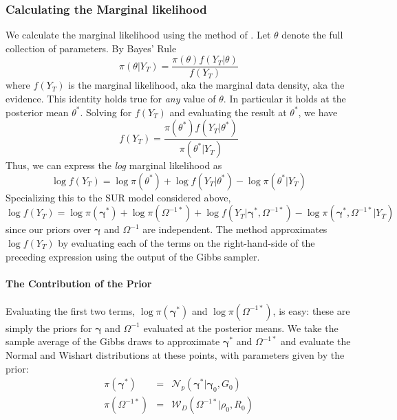 \documentclass[12pt]{article}
\begin{document}
\subsubsection{Calculating the Marginal likelihood}
We calculate the marginal likelihood using the method of \cite{chib1995marginal}.
Let $\theta$ denote the full collection of parameters.
By Bayes' Rule
\begin{equation*}
\pi\left( \theta | Y_T \right) = \frac{\pi(\theta)f(Y_T|\theta)}{f(Y_T)}  
\end{equation*}
where $f(Y_T)$ is the marginal likelihood, aka the marginal data density, aka the evidence.
This identity holds true for \emph{any} value of $\theta$.
In particular it holds at the posterior mean $\theta^*$.
Solving for $f(Y_T)$ and evaluating the result at $\theta^*$, we have 
\begin{equation*}
f\left(Y_T \right) = \frac{\pi(\theta^*)f(Y_T|\theta^*)}{\pi(\theta^*|Y_T)}  
\end{equation*}
Thus, we can express the \emph{log} marginal likelihood as
\begin{equation*}
\log f(Y_T) = \log \pi(\theta^*) + \log f\left( Y_T|\theta^* \right) - \log \pi\left( \theta^*|Y_T \right)
\end{equation*}
Specializing this to the SUR model considered above,
\begin{equation*}
\log f(Y_T) = \log \pi(\boldsymbol{\gamma}^*) + \log \pi\left( \Omega^{-1*} \right) + \log f\left( Y_T|\boldsymbol{\gamma}^*, \Omega^{-1*} \right) - \log \pi\left( \boldsymbol{\gamma}^*, \Omega^{-1*}|Y_T \right)
\end{equation*}
since our priors over $\boldsymbol{\gamma}$ and $\Omega^{-1}$ are independent.
The \cite{chib1995marginal} method approximates $\log f(Y_T)$ by evaluating each of the terms on the right-hand-side of the preceding expression using the output of the Gibbs sampler.

\paragraph{The Contribution of the Prior}
Evaluating the first two terms, $\log \pi(\boldsymbol{\gamma}^*)$ and $\log \pi\left( \Omega^{-1*} \right)$, is easy: these are simply the priors for $\boldsymbol{\gamma}$ and $\Omega^{-1}$ evaluated at the posterior means.
We take the sample average of the Gibbs draws to approximate $\boldsymbol{\gamma}^*$ and $\Omega^{-1*}$ and evaluate the Normal and Wishart distributions at these points, with parameters given by the prior:
\begin{eqnarray*}
	\pi\left( \boldsymbol{\gamma}^* \right) &=& \mathcal{N}_p\left( \boldsymbol{\gamma}^* | \boldsymbol{\gamma}_0, G_0 \right)\\
	\pi\left( \Omega^{-1*} \right) &=& \mathcal{W}_D\left( \Omega^{-1*}|\rho_0, R_0 \right)
\end{eqnarray*}
\end{document}
